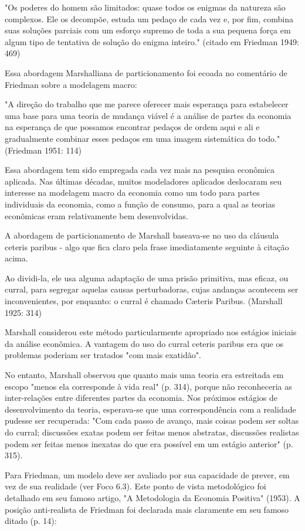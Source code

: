 \documentclass[12pt]{article}
\begin{document}
"Os poderes do homem são limitados: quase todos os enigmas da natureza são complexos. Ele os decompõe, estuda um pedaço de cada vez e, por fim, combina suas soluções parciais com um esforço supremo de toda a sua pequena força em algum tipo de tentativa de solução do enigma inteiro."
(citado em Friedman 1949: 469)

Essa abordagem Marshalliana de particionamento foi ecoada no comentário de Friedman sobre a modelagem macro:

"A direção do trabalho que me parece oferecer mais esperança para estabelecer uma base para uma teoria de mudança viável é a análise de partes da economia na esperança de que possamos encontrar pedaços de ordem aqui e ali e gradualmente combinar esses pedaços em uma imagem sistemática do todo."
(Friedman 1951: 114)

Essa abordagem tem sido empregada cada vez mais na pesquisa econômica aplicada. Nas últimas décadas, muitos modeladores aplicados deslocaram seu interesse na modelagem macro da economia como um todo para partes individuais da economia, como a função de consumo, para a qual as teorias econômicas eram relativamente bem desenvolvidas.

A abordagem de particionamento de Marshall baseava-se no uso da cláusula ceteris paribus - algo que fica claro pela frase imediatamente seguinte à citação acima.

Ao dividi-la, ele usa alguma adaptação de uma prisão primitiva, mas eficaz, ou curral, para segregar aquelas causas perturbadoras, cujas andanças acontecem ser inconvenientes, por enquanto: o curral é chamado Cæteris Paribus.
(Marshall 1925: 314)

Marshall considerou este método particularmente apropriado nos estágios iniciais da análise econômica. A vantagem do uso do curral ceteris paribus era que os problemas poderiam ser tratados "com mais exatidão".

No entanto, Marshall observou que quanto mais uma teoria era estreitada em escopo "menos ela corresponde à vida real" (p. 314), porque não reconheceria as inter-relações entre diferentes partes da economia. Nos próximos estágios de desenvolvimento da teoria, esperava-se que uma correspondência com a realidade pudesse ser recuperada: "Com cada passo de avanço, mais coisas podem ser soltas do curral; discussões exatas podem ser feitas menos abstratas, discussões realistas podem ser feitas menos inexatas do que era possível em um estágio anterior" (p. 315).

Para Friedman, um modelo deve ser avaliado por sua capacidade de prever, em vez de sua realidade (ver Foco 6.3). Este ponto de vista metodológico foi detalhado em seu famoso artigo, "A Metodologia da Economia Positiva" (1953). A posição anti-realista de Friedman foi declarada mais claramente em seu famoso ditado (p. 14):
\end{document}
